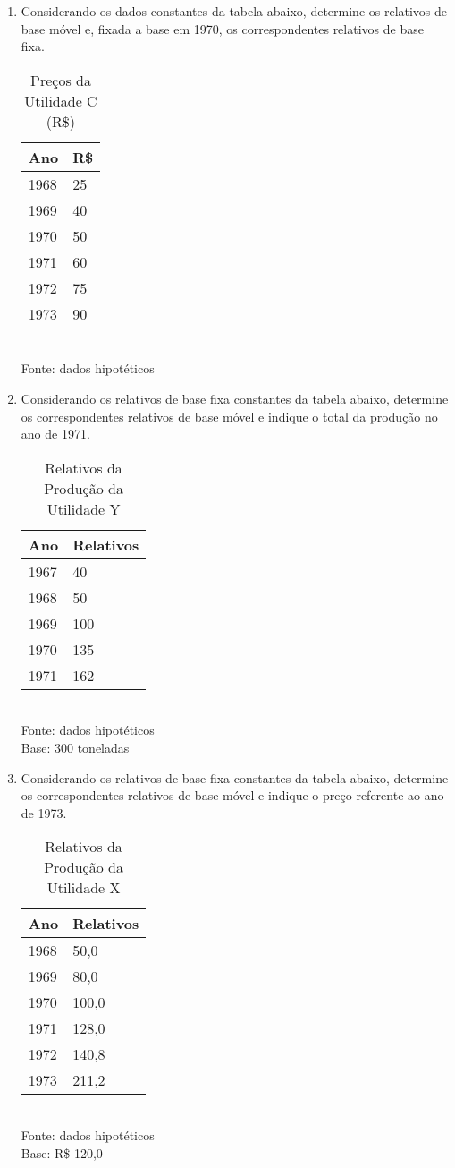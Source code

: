 \begin{enumerate}[resume]
\item Considerando os dados constantes da tabela abaixo, determine os relativos de base móvel e, fixada a base em 1970, os correspondentes relativos de base fixa.
	\begin{table}[!htb]
	\centering
	\caption{Preços da Utilidade C (R\$)}
	\begin{tabular}{ll}
	Ano & R\$ \\
	\hline 
	1968 & 25  \\
	1969 & 40  \\
	1970 & 50  \\
	1971 & 60  \\
	1972 & 75  \\
	1973 & 90  \\
	\end{tabular} 
	\\ Fonte: dados hipotéticos
	\end{table}
	
\item Considerando os relativos de base fixa constantes da tabela abaixo, determine os correspondentes relativos de base móvel e indique o total da produção no ano de 1971.
	\begin{table}[!htb]
	\centering
	\caption{Relativos da Produção da Utilidade Y}
	\begin{tabular}{ll}
	Ano & Relativos \\
	\hline 
	1967 & 40  \\
	1968 & 50  \\
	1969 & 100  \\
	1970 & 135  \\
	1971 & 162  \\
	\end{tabular} 
	\\ Fonte: dados hipotéticos\\
	Base: 300 toneladas
	\end{table}
	
\item Considerando os relativos de base fixa constantes da tabela abaixo, determine os correspondentes relativos de base móvel e indique o preço referente ao ano de 1973. 
	\begin{table}[!htb]
	\centering
	\caption{Relativos da Produção da Utilidade X}
	\begin{tabular}{ll}
	Ano & Relativos \\
	\hline 
	1968 & 50,0 \\
	1969 & 80,0 \\
	1970 & 100,0 \\
	1971 & 128,0 \\
	1972 & 140,8  \\
	1973 & 211,2  \\
	\end{tabular} 
	\\ Fonte: dados hipotéticos\\
	Base: R\$ 120,0
	\end{table}		


\end{enumerate}
